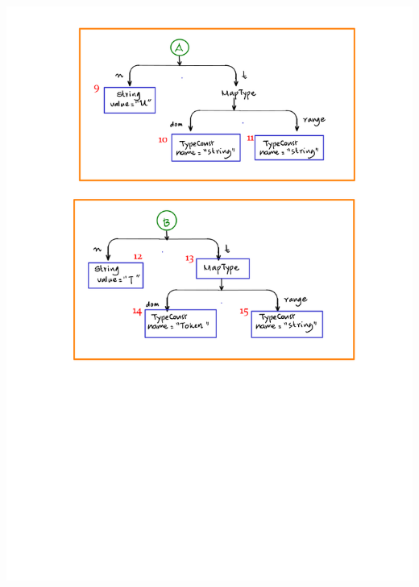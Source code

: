 \documentclass[12pts, a4paper]{article}
\begin{document}
\begin{center}
\includegraphics[width=\textwidth]{../images/spec-AST-3.png}


\end{center}
\end{document}
